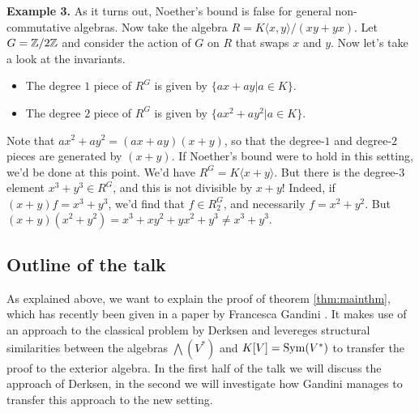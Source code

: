 \documentclass[../main.tex]{subfiles}
\begin{document}
\textbf{Example 3.} 
As it turns out, Noether's bound is false for general non-commutative algebras. 
Now take the algebra $R = K\langle x,y \rangle/(xy+yx)$.
Let $G = \mathbb{Z}/2\mathbb{Z}$ and consider the action of $G$ on $R$ that swaps $x$ and $y$. Now let's
take a look at the invariants. 
\begin{itemize}
    \item The degree $1$ piece of $R^G$ is given by $\{ax + ay | a \in K\}$.
    \item The degree $2$ piece of $R^G$ is given by $\{ax^2 + ay^2 | a \in K\}$.
\end{itemize}
Note that $ax^2 + ay^2 = (ax+ay)(x+y)$, so that the degree-$1$ and degree-$2$ pieces
are generated by $(x+y)$. If Noether's bound were to hold in this setting, we'd
be done at this point. We'd have $R^G = K\langle x+y \rangle$. But there is the
degree-$3$ element $x^3+y^3 \in R^G$, and this is not divisible by $x+y$!
Indeed, if $(x+y)f = x^3 +y^3$, we'd find that $f \in R^G_2$, and necessarily
$f = x^2 + y^2$. But $(x+y)(x^2 + y^2) = x^3 + xy^2 + yx^2 + y^3 \neq x^3 + y^3.$

\subsection{Outline of the talk} %
\label{sub:Outline of the talk}
As explained above, we want to explain the proof of theorem \ref{thm:mainthm},
which has recently been given in a paper by Francesca Gandini 
\cite{gandini2021degree}. It makes use of an approach to the classical 
problem by Derksen and levereges structural similarities between the algebras
$\bigwedge(V^*)$ and $K[V] = \operatorname{Sym}(V^*)$ to transfer the proof to the 
exterior algebra. In the first half of the talk we will discuss 
the approach of Derksen, in the second we will investigate how Gandini manages
to transfer this approach to the new setting.
\end{document}
